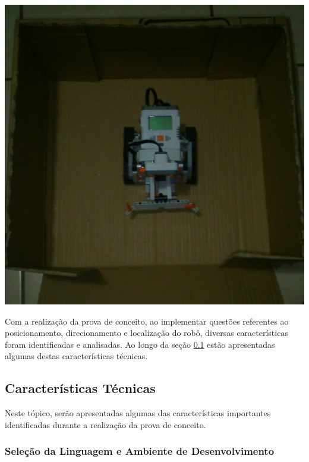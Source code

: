 		{\centering
		\includegraphics[scale=0.5]{figuras/ambienteConceito.eps}
		\label{img:ambienteProva}
		\par}

		Com a realização da prova de conceito, ao implementar questões referentes ao posicionamento, direcionamento e localização do robô, diversas características foram identificadas e analisadas. Ao longo da seção \ref{sub:características_técnicas} estão apresentadas algumas destas características técnicas.


	\subsection{Características Técnicas} %
	\label{sub:características_técnicas}

		Neste tópico, serão apresentadas algumas das características importantes identificadas durante a realização da prova de conceito.

		\subsubsection{Seleção da Linguagem e Ambiente de Desenvolvimento}


